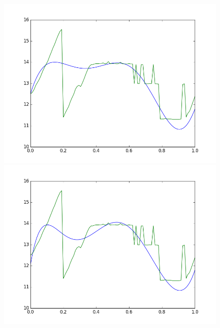 \documentclass[]{jsarticle}
\begin{document}
\begin{figure}[htbp]
 \begin{minipage}[b]{0.5\hsize}
  \includegraphics[scale=0.4]{./images/02polym_sq.png}
 \end{minipage}
 \begin{minipage}[b]{0.5\hsize}
  \includegraphics[scale=0.4]{./images/02polym100c.png}
 \end{minipage}
 \begin{minipage}[b]{0.5\hsize}

\end{minipage}
\end{figure}
\end{document}
